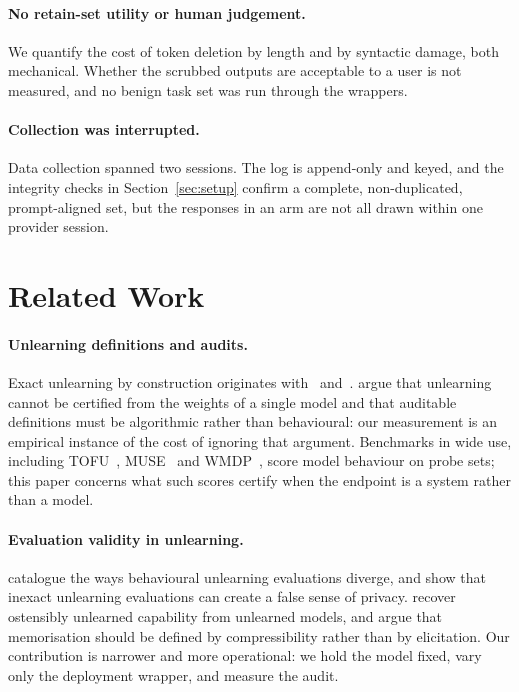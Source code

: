\documentclass[journal]{IEEEtran}
\providecommand{\citet}[1]{\cite{#1}}
\theoremstyle{definition}
\begin{document}
\paragraph{No retain-set utility or human judgement.} We quantify the cost of
token deletion by length and by syntactic damage, both mechanical. Whether the
scrubbed outputs are acceptable to a user is not measured, and no benign task
set was run through the wrappers.

\paragraph{Collection was interrupted.} Data collection spanned two sessions. The
log is append-only and keyed, and the integrity checks in Section~\ref{sec:setup}
confirm a complete, non-duplicated, prompt-aligned set, but the responses in an
arm are not all drawn within one provider session.

\section{Related Work}

\paragraph{Unlearning definitions and audits.} Exact unlearning by construction
originates with~\citet{cao2015towards} and~\citet{bourtoule2021machine}.
\citet{thudi2022necessity} argue that unlearning cannot be certified from the
weights of a single model and that auditable definitions must be algorithmic
rather than behavioural: our measurement is an empirical instance of the cost
of ignoring that argument. Benchmarks in wide use, including
TOFU~\cite{maini2024tofu}, MUSE~\cite{shi2024muse} and WMDP~\cite{li2024wmdp},
score model behaviour on probe sets; this paper concerns what such scores
certify when the endpoint is a system rather than a model.

\paragraph{Evaluation validity in unlearning.} \citet{lynch2024eight} catalogue
the ways behavioural unlearning evaluations diverge, and \citet{hayes2024inexact}
show that inexact unlearning evaluations can create a false sense of privacy.
\citet{lucki2024adversarial} recover ostensibly unlearned capability from
unlearned models, and \citet{schwarzschild2024acr} argue that memorisation should
be defined by compressibility rather than by elicitation. Our contribution is
narrower and more operational: we hold the model fixed, vary only the deployment
wrapper, and measure the audit.
\end{document}
